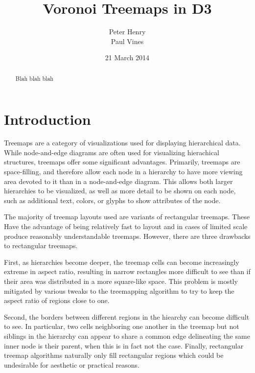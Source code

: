 \documentclass{acm_proc_article-sp}
\begin{document}
\title{Voronoi Treemaps in D3}

 \author{ \alignauthor Peter Henry
  \\ 
  \alignauthor Paul Vines \\  } \date{21 March
  2014}

\maketitle
\begin{abstract}
Blah blah blah
\end{abstract}


\section{Introduction}
Treemaps are a category of visualizations used for displaying
hierarchical data. While node-and-edge diagrams are often used for
visualizing hierachical structures, treemaps offer some significant
advantages. Primarily, treemaps are space-filling, and therefore allow
each node in a hierarchy to have more viewing area devoted to it than
in a node-and-edge diagram. This allows both larger hierarchies to be
visualized, as well as more detail to be shown on each node, such as
additional text, colors, or glyphs to show attributes of the node.

The majority of treemap layouts used are variants of rectangular
treemaps. These Have the advantage of being relatively fast to layout
and in cases of limited scale produce reasonably understandable
treemaps. However, there are three drawbacks to rectangular treemaps.

First, as hierarchies become deeper, the treemap cells can become
increasingly extreme in aspect ratio, resulting in narrow rectangles
more difficult to see than if their area was distributed in a more
square-like space. This problem is mostly mitigated by various tweaks
to the treemapping algorithm to try to keep the aspect ratio of
regions close to one.

Second, the borders between different regions in the hiearchy can
become difficult to see. In particular, two cells neighboring one
another in the treemap but not siblings in the hierarchy can appear to
share a common edge delineating the same inner node is their parent,
when this is in fact not the case.  Finally, rectangular treemap
algorithms naturally only fill rectangular regions which could be
undesirable for aesthetic or practical reasons.
\end{document}
